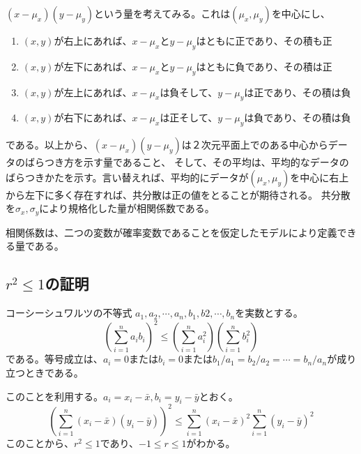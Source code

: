 $(x-\mu_x)(y-\mu_y)$という量を考えてみる。これは$(\mu_x,\mu_y)$を中心にし、
\begin{enumerate}
 \item $(x,y)$が右上にあれば、$x-\mu_x$と$y-\mu_y$はともに正であり、その積も正
 \item $(x,y)$が左下にあれば、$x-\mu_x$と$y-\mu_y$はともに負であり、その積は正
 \item $(x,y)$が左上にあれば、$x-\mu_x$は負そして、$y-\mu_y$は正であり、その積は負
 \item $(x,y)$が右下にあれば、$x-\mu_x$は正そして、$y-\mu_y$は負であり、その積は負
\end{enumerate}
である。以上から、$(x-\mu_x)(y-\mu_y)$は２次元平面上でのある中心からデータのばらつき方を示す量であること、
そして、その平均は、平均的なデータのばらつきかたを示す。言い替えれば、平均的にデータが$(\mu_x,\mu_y)$を中心に右上から左下に多く存在すれば、共分散は正の値をとることが期待される。
共分散を$\sigma_x,\sigma_y$により規格化した量が相関係数である。

相関係数は、二つの変数が確率変数であることを仮定したモデルにより定義できる量である。


\subsection{$r^2\leq 1$の証明}
コーシーシュワルツの不等式
$a_1,a_2,\cdots,a_n,b_1,b2,\cdots,b_n$を実数とする。
\begin{equation*}
 (\sum_{i=1}^n a_i b_i)^2 \leq (\sum_{i=1}^n a_i^2)(\sum_{i=1}^n b_i^2)
\end{equation*}
である。等号成立は、$a_i=0$または$b_i=0$または$b_1/a_1=b_2/a_2=\cdots=b_n/a_n$が成り立つときである。

このことを利用する。$a_i=x_i-\bar{x},b_i=y_i-\bar{y}$とおく。
\begin{equation*}
 \left(\sum_{i=1}^n (x_i-\bar{x})(y_i-\bar{y})\right)^2 \leq  \sum_{i=1}^n(x_i-\bar{x})^2\sum_{i=1}^n(y_i-\bar{y})^2
\end{equation*}
このことから、$r^2\leq 1$であり、$-1\leq r \leq 1$がわかる。


